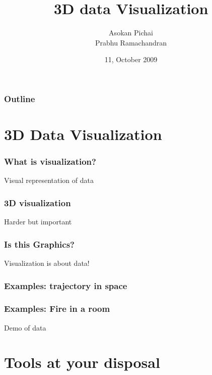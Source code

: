 \documentclass[compress,14pt]{beamer}
\title[]{3D data Visualization}
\author[FOSSEE Team] {Asokan Pichai\\Prabhu Ramachandran}
\institute[IIT Bombay] {Department of Aerospace Engineering\\IIT Bombay}
\date[] {11, October 2009}
\date[] %
\newcounter{time}
\newcommand{\inctime}[1]{\addtocounter{time}{#1}{\vspace*{0.1in}\tiny \thetime\ m}}
\begin{document}
\begin{frame}
  \maketitle
\end{frame}

\begin{frame}
  \frametitle{Outline}
  \Large
  \tableofcontents
\end{frame}

\section{3D Data Visualization}

\begin{frame}
    \frametitle{What is visualization?}
    \Large
    \begin{center}
    Visual representation of data
    \end{center}
\end{frame}

\begin{frame}
    \frametitle{3D visualization}
    \Large
    \begin{center}
        Harder but important
    \end{center}
\end{frame}

\begin{frame}
    \frametitle{Is this Graphics?}
    \Large
    \begin{center}
        Visualization is about data!
    \end{center}
\end{frame}

\begin{frame}
    \frametitle{Examples: trajectory in space}
    \Large
    \begin{center}
    \end{center}
\end{frame}

\begin{frame}
    \frametitle{Examples: Fire in a room}
    \Large
    \begin{center}
        Demo of data
    \end{center}
\inctime{10}
\end{frame}

\section{Tools at your disposal}
\end{document}
